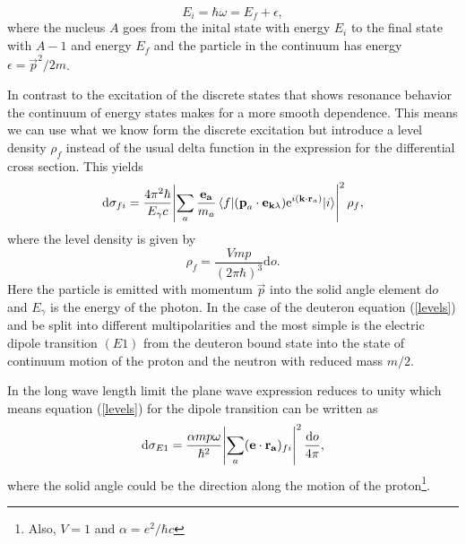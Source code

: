\begin{equation}
    E_i = \hbar \omega = E_f + \epsilon,
\end{equation}
where the nucleus $A$ goes from the inital state with energy $E_i$ to the final state with $A-1$ and energy $E_f$ and the particle in the continuum has energy $\epsilon = \vec{p}^2/2m$. 

In contrast to the excitation of the discrete states that shows resonance behavior the continuum of energy states makes for a more smooth dependence. This means we can use what we know form the discrete excitation but introduce a level density $\rho_f$ instead of the usual delta function in the expression for the differential cross section. This yields
\begin{equation}\label{levels}
    \textrm{d}\sigma_{fi} = \frac{4\pi^2\hbar}{E_\gamma c}\abs{\sum_a \frac{\bm{\mathrm{e_a}}}{m_a}\mel{f}{(\bm{\mathrm{p}}_a\cdot \bm{\mathrm{e}}_{\bm{\mathrm{k}}\lambda})\textrm{e}^{i(\bm{\mathrm{k}}\cdot \bm{\mathrm{r}}_a)}}{i}}^2 \rho_f,
\end{equation}
where the level density is given by
\begin{equation}
    \rho_f = \frac{Vmp}{(2\pi\hbar)^3} \textrm{d}o.
\end{equation}
Here the particle is emitted with momentum $\vec{p}$ into the solid angle element $\textrm{d}o$ and $E_\gamma$ is the energy of the photon. In the case of the deuteron equation (\ref{levels}) and be split into different multipolarities and the most simple is the electric dipole transition $(E1)$ from the deuteron bound state into the state of continuum motion of the proton and the neutron with reduced mass $m/2$. 

In the long wave length limit the plane wave expression reduces to unity which means equation (\ref{levels}) for the dipole transition can be written as
\begin{equation} \label{diffE1}
    \textrm{d}\sigma_{E1} = \frac{\alpha mp\omega}{\hbar^2} \abs{\sum_a (\bm{\mathrm{e}}\cdot \bm{\mathrm{r_a}})_{fi}}^2 \frac{\textrm{d}o}{4\pi},
\end{equation}
where the solid angle could be the direction along the motion of the proton\footnote{Also, $V=1$ and $\alpha=e^2/\hbar c$}.

